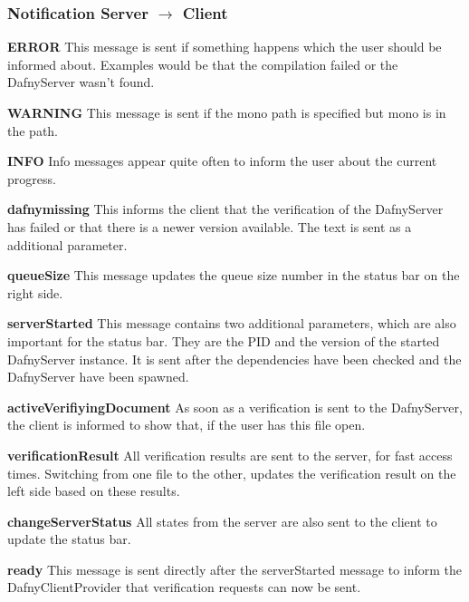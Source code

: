 \subsubsection{Notification Server $\longrightarrow$ Client}

\textbf{ERROR}
This message is sent if something happens which the user should be informed about. Examples would be that the compilation failed or the DafnyServer wasn't found. \newline

\textbf{WARNING}
This message is sent if the mono path is specified but mono is in the path. \newline

\textbf{INFO}
Info messages appear quite often to inform the user about the current progress. \newline

\textbf{dafnymissing}
This informs the client that the verification of the DafnyServer has failed or that there is a newer version available. The text is sent as a additional parameter.  \newline

\textbf{queueSize}
This message updates the queue size number in the status bar on the right side. \newline

\textbf{serverStarted}
This message contains two additional parameters, which are also important for the status bar. They are the PID and the version of the started DafnyServer instance. It is sent after the dependencies have been checked and the DafnyServer have been spawned. \newline

\textbf{activeVerifiyingDocument}
As soon as a verification is sent to the DafnyServer, the client is informed to show that, if the user has this file open. \newline

\textbf{verificationResult}
All verification results are sent to the server, for fast access times. Switching from one file to the other, updates the verification result on the left side based on these results. \newline

\textbf{changeServerStatus}
All states from the server are also sent to the client to update the status bar. \newline

\textbf{ready}
This message is sent directly after the serverStarted message to inform the DafnyClientProvider that verification requests can now be sent. \newline

